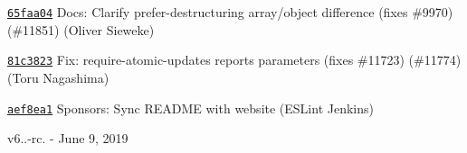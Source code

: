 \begin{DoxyItemize}
\item \href{https://github.com/eslint/eslint/commit/65faa04e8b42eecd4505111bbff296951179f033}{\texttt{ {\ttfamily 65faa04}}} Docs\+: Clarify prefer-\/destructuring array/object difference (fixes \#9970) (\#11851) (Oliver Sieweke)
\item \href{https://github.com/eslint/eslint/commit/81c382378923a45015bafe58362f6c8faa5c3d5f}{\texttt{ {\ttfamily 81c3823}}} Fix\+: require-\/atomic-\/updates reports parameters (fixes \#11723) (\#11774) (Toru Nagashima)
\item \href{https://github.com/eslint/eslint/commit/aef8ea1a44b9f13d468f48536c4c93f79f201d9b}{\texttt{ {\ttfamily aef8ea1}}} Sponsors\+: Sync README with website (ESLint Jenkins)
\end{DoxyItemize}

v6..-\/rc. -\/ June 9, 2019


